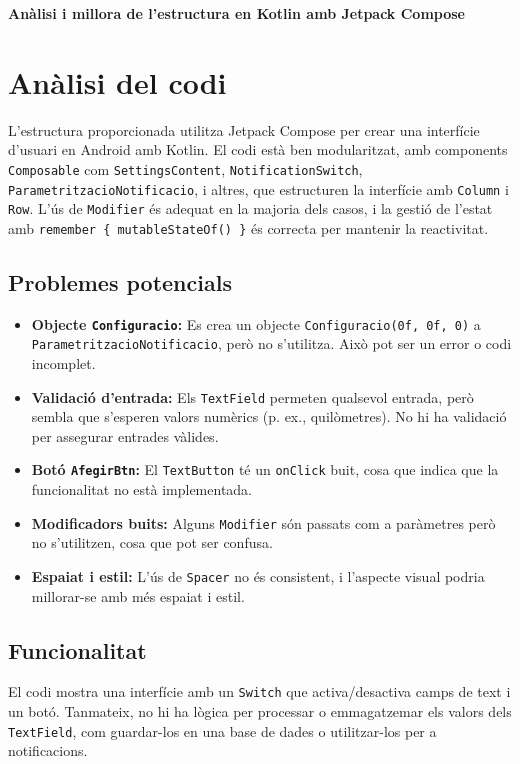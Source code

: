 \documentclass[a4paper,12pt]{article}
\begin{document}
\begin{center}
    \textbf{\Large Anàlisi i millora de l'estructura en Kotlin amb Jetpack Compose}
\end{center}

\section{Anàlisi del codi}

L'estructura proporcionada utilitza Jetpack Compose per crear una interfície d'usuari en Android amb Kotlin. El codi està ben modularitzat, amb components \texttt{Composable} com \texttt{SettingsContent}, \texttt{NotificationSwitch}, \texttt{ParametritzacioNotificacio}, i altres, que estructuren la interfície amb \texttt{Column} i \texttt{Row}. L'ús de \texttt{Modifier} és adequat en la majoria dels casos, i la gestió de l'estat amb \texttt{remember \{ mutableStateOf() \}} és correcta per mantenir la reactivitat.

\subsection{Problemes potencials}
\begin{itemize}
    \item \textbf{Objecte \texttt{Configuracio}:} Es crea un objecte \texttt{Configuracio(0f, 0f, 0)} a \texttt{ParametritzacioNotificacio}, però no s'utilitza. Això pot ser un error o codi incomplet.
    \item \textbf{Validació d'entrada:} Els \texttt{TextField} permeten qualsevol entrada, però sembla que s'esperen valors numèrics (p. ex., quilòmetres). No hi ha validació per assegurar entrades vàlides.
    \item \textbf{Botó \texttt{AfegirBtn}:} El \texttt{TextButton} té un \texttt{onClick} buit, cosa que indica que la funcionalitat no està implementada.
    \item \textbf{Modificadors buits:} Alguns \texttt{Modifier} són passats com a paràmetres però no s'utilitzen, cosa que pot ser confusa.
    \item \textbf{Espaiat i estil:} L'ús de \texttt{Spacer} no és consistent, i l'aspecte visual podria millorar-se amb més espaiat i estil.
\end{itemize}

\subsection{Funcionalitat}
El codi mostra una interfície amb un \texttt{Switch} que activa/desactiva camps de text i un botó. Tanmateix, no hi ha lògica per processar o emmagatzemar els valors dels \texttt{TextField}, com guardar-los en una base de dades o utilitzar-los per a notificacions.
\end{document}
